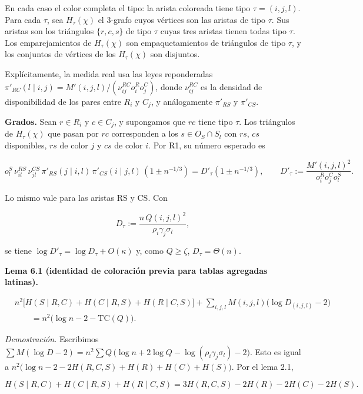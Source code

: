 \documentclass[spanish,11pt,a4paper]{article}
\begin{document}
En cada caso el color completa el tipo: la arista coloreada tiene tipo \(\tau=(i,j,l)\). Para cada \(\tau\), sea \(H_\tau(\chi)\) el 3-grafo cuyos vértices son las aristas de tipo \(\tau\). Sus aristas son los triángulos \(\{r,c,s\}\) de tipo \(\tau\) cuyas tres aristas tienen todas tipo \(\tau\). Los emparejamientos de \(H_\tau(\chi)\) son empaquetamientos de triángulos de tipo \(\tau\), y los conjuntos de vértices de los \(H_\tau(\chi)\) son disjuntos.

Explícitamente, la medida real usa las leyes reponderadas \(\pi'_{RC}(l\mid i,j)=M'(i,j,l)/(\nu^{RC}_{ij}o^R_io^C_j)\), donde \(\nu^{RC}_{ij}\) es la densidad de disponibilidad de los pares entre \(R_i\) y \(C_j\), y análogamente \(\pi'_{RS}\) y \(\pi'_{CS}\).

\textbf{Grados.} Sean \(r\in R_i\) y \(c\in C_j\), y supongamos que \(rc\) tiene tipo \(\tau\). Los triángulos de \(H_\tau(\chi)\) que pasan por \(rc\) corresponden a los \(s\in O_S\cap S_l\) con \(rs\), \(cs\) disponibles, \(rs\) de color \(j\) y \(cs\) de color \(i\). Por R1, su número esperado es

\nopagebreak[4]
\[o^S_l\,\nu^{RS}_{il}\,\nu^{CS}_{jl}\,\pi'_{RS}(j\mid i,l)\,\pi'_{CS}(i\mid j,l)\,(1\pm n^{-1/3})=D'_\tau(1\pm n^{-1/3}),\qquad
D'_\tau:=\frac{M'(i,j,l)^2}{o^R_io^C_jo^S_l}.\]

Lo mismo vale para las aristas RS y CS. Con

\nopagebreak[4]
\[D_\tau:=\frac{n\,Q(i,j,l)^2}{\rho_i\gamma_j\sigma_l},\]

se tiene \(\log D'_\tau=\log D_\tau+O(\kappa)\) y, como \(Q\ge\zeta\), \(D_\tau=\Theta(n)\).

\textbf{Lema 6.1 (identidad de coloración previa para tablas agregadas latinas).}

\nopagebreak[4]
\[\begin{aligned}
&n^2\bigl[H(S\mid R,C)+H(C\mid R,S)+H(R\mid C,S)\bigr]+\sum_{i,j,l}M(i,j,l)\bigl(\log D_{(i,j,l)}-2\bigr)\\
&\qquad=n^2\bigl(\log n-2-\mathrm{TC}(Q)\bigr).
\end{aligned}\]

\emph{Demostración.} Escribimos \(\sum M(\log D-2)=n^2\sum Q\,\bigl(\log n+2\log Q-\log(\rho_i\gamma_j\sigma_l)-2\bigr)\). Esto es igual a \(n^2\bigl(\log n-2-2H(R,C,S)+H(R)+H(C)+H(S)\bigr)\). Por el lema 2.1,

\nopagebreak[4]
\[H(S\mid R,C)+H(C\mid R,S)+H(R\mid C,S)=3H(R,C,S)-2H(R)-2H(C)-2H(S).\]
\end{document}
